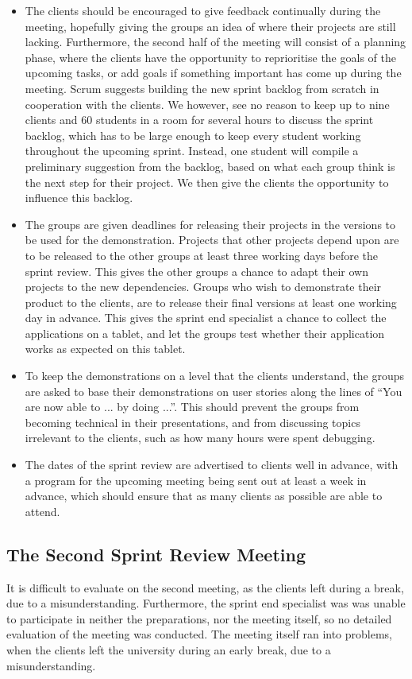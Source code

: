 \begin{itemize}
	\item The clients should be encouraged to give feedback continually during the meeting, hopefully giving the groups an idea of where their projects are still lacking. Furthermore, the second half of the meeting will consist of a planning phase, where the clients have the opportunity to reprioritise the goals of the upcoming tasks, or add goals if something important has come up during the meeting. Scrum suggests building the new 	sprint backlog from scratch in cooperation with the clients. We however, see no reason to keep up to nine clients and 60 students in a room for several hours to discuss the sprint backlog, which has to be large enough to keep every student working throughout the upcoming sprint. Instead, one student will compile a preliminary suggestion from the backlog, based on what each group think is the next step for their project. We then give the clients the opportunity to influence this backlog.
	\item The groups are given deadlines for releasing their projects in the versions to be used for the demonstration. Projects that other projects depend upon are to be released to the other groups at least three working days before the sprint review. This gives the other groups a chance to adapt their own projects to the new dependencies. Groups who wish to demonstrate their product to the clients, are to release their final versions at least one working day in advance. This gives the sprint end specialist a chance to collect the applications on a tablet, and let the groups test whether their application works as expected on this tablet. 
	\item To keep the demonstrations on a level that the clients understand, the groups are asked to base their demonstrations on user stories along the lines of ``You are now able to ... by doing ...''. This should prevent the groups from becoming technical in their presentations, and from discussing topics irrelevant to the clients, such as how many hours were spent debugging. 
	\item The dates of the sprint review are advertised to clients well in advance, with a program for the upcoming meeting being sent out at least a week in advance, which should ensure that as many clients as possible are able to attend. 
\end{itemize}

\subsection{The Second Sprint Review Meeting}
\label{collab:sprintend:two}
It is difficult to evaluate on the second meeting, as the clients left during a break, due to a misunderstanding. Furthermore, the sprint end specialist was was unable to participate in neither the preparations, nor the meeting itself, so no detailed evaluation of the meeting was conducted. The meeting itself ran into problems, when the clients left the university during an early break, due to a misunderstanding. 

